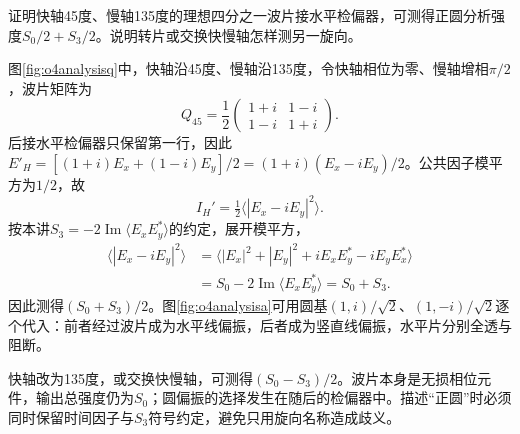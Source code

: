 \begin{example}\label{ex:o4quarteranalysis}
证明快轴45度、慢轴135度的理想四分之一波片接水平检偏器，可测得正圆分析强度$S_0/2+S_3/2$。说明转片或交换快慢轴怎样测另一旋向。
\end{example}
\begin{solution}
图\ref{fig:o4analysisq}中，快轴沿45度、慢轴沿135度，令快轴相位为零、慢轴增相$\pi/2$，波片矩阵为
\[
 Q_{45}=\frac12\begin{pmatrix}1+i&1-i\\1-i&1+i\end{pmatrix}.
\]
后接水平检偏器只保留第一行，因此$E'_H=[(1+i)E_x+(1-i)E_y]/2=(1+i)(E_x-iE_y)/2$。公共因子模平方为$1/2$，故
\[
 I_H'=\tfrac12\langle|E_x-iE_y|^2\rangle.
\]
按本讲$S_3=-2\operatorname{Im}\langle E_xE_y^*\rangle$的约定，展开模平方，
\begin{align*}
 \langle|E_x-iE_y|^2\rangle
 &=\langle|E_x|^2+|E_y|^2+iE_xE_y^*-iE_yE_x^*\rangle\\
 &=S_0-2\operatorname{Im}\langle E_xE_y^*\rangle=S_0+S_3.
\end{align*}
因此测得$(S_0+S_3)/2$。图\ref{fig:o4analysisa}可用圆基$(1,i)/\sqrt2$、$(1,-i)/\sqrt2$逐个代入：前者经过波片成为水平线偏振，后者成为竖直线偏振，水平片分别全透与阻断。

快轴改为135度，或交换快慢轴，可测得$(S_0-S_3)/2$。波片本身是无损相位元件，输出总强度仍为$S_0$；圆偏振的选择发生在随后的检偏器中。描述“正圆”时必须同时保留时间因子与$S_3$符号约定，避免只用旋向名称造成歧义。
\end{solution}

